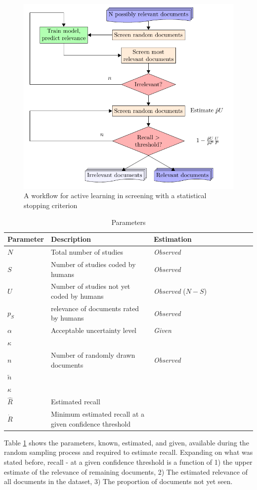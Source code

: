 \documentclass{bmcart}
\begin{document}
	\begin{figure}
		\includegraphics[width=0.5\linewidth]{../images/flow}
		\caption{A workflow for active learning in screening with a statistical stopping criterion}
		\label{flow}
	\end{figure}
	
	\begin{table}
		\begin{tabular}{p{0.15\linewidth} p{0.425\linewidth} p{0.425\linewidth}}
			Parameter & Description & Estimation \\
			\hline
			$ N  $ &  Total number of studies & \textit{Observed} \\
			$ S $ & Number of studies coded by humans & \textit{Observed} \\
			$ U $ & Number of studies not yet coded by humans & \textit{Observed} ($N - S$) \\
			$ p_S $ & relevance of documents rated by humans & \textit{Observed} \\
			$ \alpha $ & Acceptable uncertainty level & \textit{Given} \\
			$ \kappa $ & & \\
			$ n $ & Number of randomly drawn documents & \textit{Observed} \\
			$ \tilde{n} $ & & \\
			$ \kappa $ & & \\
			$ \hat{R} $ & Estimated recall & \\
			$ \dot{R} $ & Minimum estimated recall at a given confidence threshold & \\
		\end{tabular}
		\caption{Parameters}
		\label{parameters}
	\end{table}
	
	Table \ref{parameters} shows the parameters, known, estimated, and given, available during the random sampling process and required to estimate recall. Expanding on what was stated before, recall - at a given confidence threshold is a function of 1) the upper estimate of the relevance of remaining documents, 2) The estimated relevance of all documents in the dataset, 3) The proportion of documents not yet seen. 
	
\end{document}
